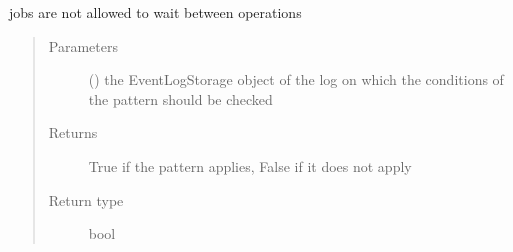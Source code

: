 \documentclass[letterpaper,10pt,english]{sphinxmanual}
\begin{document}
\begin{fulllineitems}
\begin{fulllineitems}
\label{\detokenize{event_log_analyzer:event_log_analyzer.pattern_library.manufacturing_scheduling_patterns.NoWait.pattern_applies}}
\sphinxAtStartPar
jobs are not allowed to wait between operations
\begin{quote}\begin{description}
\item[{Parameters}] \leavevmode
\sphinxAtStartPar
{} ({\hyperref[\detokenize{event_log_analyzer:event_log_analyzer.event_log.EventLogStorage}]{}}) \textendash{} the EventLogStorage object of the log on which the conditions of the pattern should be checked

\item[{Returns}] \leavevmode
\sphinxAtStartPar
True if the pattern applies, False if it does not apply

\item[{Return type}] \leavevmode
\sphinxAtStartPar
bool

\end{description}\end{quote}

\end{fulllineitems}


\end{fulllineitems}

\end{document}
